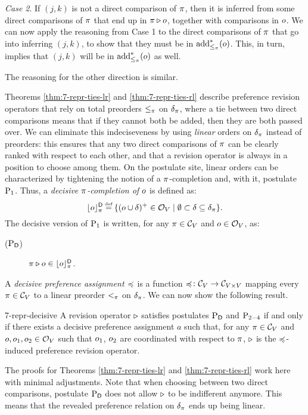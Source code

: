 \begin{prf*}{}{}
	\emph{Case 2}. 
	If $(j,k)$ is not a direct comparison of $\pi$, then it is inferred from some direct
	comparisons of $\pi$ that end up in $\pi\triangleright o$,
	together with comparisons in $o$. We can now apply the reasoning from Case 1
	to the direct comparisons of $\pi$ that go into inferring $(j,k)$, to show that they must be in 
	${\operatorname{add}}^\ast_{\le_\pi}(o)$. 
	This, in turn, implies that $(j,k)$ will be in ${\operatorname{add}}^\ast_{\le_\pi}(o)$
	as well.
	
	The reasoning for the other direction is similar.
\end{prf*}


Theorems \ref{thm:7-repr-ties-lr} and \ref{thm:7-repr-ties-rl} 
describe preference revision operators that 
rely on total preorders $\le_\pi$ on $\delta_\pi$, where a tie between two direct comparisons 
means that if they cannot both be added, then they are both passed over.
We can eliminate this indeciseveness by using \emph{linear} orders on $\delta_\pi$ instead of
preorders: this ensures that any two direct comparisons of $\pi$ can be clearly ranked with respect
to each other, and that a revision operator is always in a position to choose among them.
On the postulate site, linear orders can be characterized by tightening the notion
of a $\pi$-completion and, with it, postulate $\mathrm{P}_{1}$.
Thus, a \emph{decisive $\pi$-completion of $o$} is
defined as: 
$$
\upperd{\o}_\p \defeq \{(\o\cup\d)^+\in\SPO_V\mid\emptyset\subset\d\subseteq\dir_\p\}.
$$
The decisive version of $\mathrm{P}_{1}$ is written, for any $\pi\in\mathcal{C}_V$ and $o\in\mathcal{O}_V$, as:
\begin{description}
	\item[($\mathrm{P}_{\mathsf{D}}$)] $\pi\triangleright o\in\lfloor{o}\rfloor^\mathsf{D}_\pi$. 
\end{description}

A \emph{decisive preference assignment $\preccurlyeq$} is a 
function $\preccurlyeq\colon\mathcal{C}_V\rightarrow\mathcal{C}_{V\times V}$ mapping every $\pi\in\mathcal{C}_V$ to a linear preorder $<_\pi$ on $\delta_\pi$. We can now show the following result.

\begin{thm}{}{7-repr-decisive}
	A revision operator $\triangleright$ satisfies postulates $\mathrm{P}_{\mathsf{D}}$ and $\mathrm{P}_{2-4}$ 
	if and only if
	there exists a decisive preference assignment $a$ such that, for any $\pi\in\mathcal{C}_V$
	and $o,o_1,o_2\in\mathcal{O}_V$ such that $o_1$, $o_2$ are coordinated 
	with respect to $\pi$, $\triangleright$ is the $\preccurlyeq$-induced preference revision operator.
\end{thm}
\begin{prf*}{}{}%
	The proofs for Theorems \ref{thm:7-repr-ties-lr} and \ref{thm:7-repr-ties-rl} 
	work here with minimal adjustments.
	Note that when choosing between two direct comparisons, postulate $\mathrm{P}_{\mathsf{D}}$ does not allow $\triangleright$ 
	to be indifferent anymore. This means that the revealed preference relation on $\delta_\pi$ ends up being linear.
\end{prf*}






